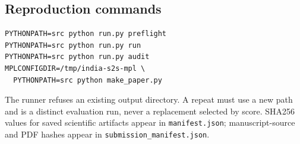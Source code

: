 \subsection{Reproduction commands}

\begin{verbatim}
PYTHONPATH=src python run.py preflight
PYTHONPATH=src python run.py run
PYTHONPATH=src python run.py audit
MPLCONFIGDIR=/tmp/india-s2s-mpl \
  PYTHONPATH=src python make_paper.py
\end{verbatim}

The runner refuses an existing output directory. A repeat must use a new path
and is a distinct evaluation run, never a replacement selected by score.
SHA256 values for saved scientific artifacts appear in
\texttt{manifest.json}; manuscript-source and PDF hashes appear in
\texttt{submission\_manifest.json}.
